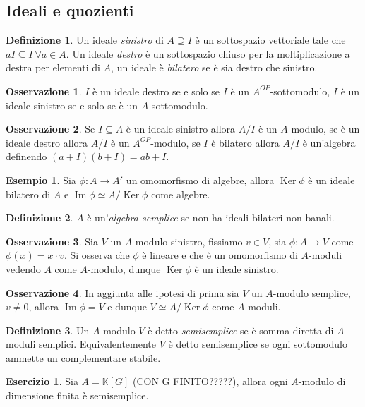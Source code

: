 \documentclass[11pt]{article}
\theoremstyle{plain}
\theoremstyle{definition}
\newtheorem{defn}{Definizione}[section]
\newtheorem{exmp}{Esempio}[section]
\newtheorem{exercise}{Esercizio}[section]
\newtheorem*{rem}{Osservazione}
\theoremstyle{remark}
\newcommand{\K}{\mathbb{K}}
\DeclareMathOperator{\Ker}{Ker}
\DeclareMathOperator{\Imm}{Im}
\DeclareMathOperator{\iso}{\simeq}
\begin{document}
\subsection{Ideali e quozienti}
	\begin{defn}
		Un ideale \textit{sinistro} di $A\supseteq I$ è un sottospazio vettoriale tale che $aI\subseteq I\ \forall a\in A$. Un ideale \textit{destro} è un sottospazio chiuso per la moltiplicazione a destra per elementi di $A$, un ideale è \textit{bilatero} se è sia destro che sinistro.
	\end{defn}
	\begin{rem}
		$I$ è un ideale destro se e solo se $I$ è un $A^{OP}$-sottomodulo, $I$ è un ideale sinistro se e solo se è un $A$-sottomodulo.
	\end{rem}
	\begin{rem}
		Se $I\subseteq A$ è un ideale sinistro allora $A/I$ è un $A$-modulo, se è un ideale destro allora $A/I$ è un $A^{OP}$-modulo, se $I$ è bilatero allora $A/I$ è un'algebra definendo $(a+I)(b+I)=ab+I$.
	\end{rem}
	\begin{exmp}
		Sia $\phi:A\to A'$ un omomorfismo di algebre, allora $\Ker \phi$ è un ideale bilatero di $A$ e $\Imm \phi \iso A/\Ker \phi$ come algebre.
	\end{exmp}
	\begin{defn}
		$A$ è un'\textit{algebra semplice} se non ha ideali bilateri non banali.
	\end{defn}
	\begin{rem}
		Sia $V$ un $A$-modulo sinistro, fissiamo $v\in V$, sia $\phi:A\to V$ come $\phi(x)=x\cdot v$. Si osserva che $\phi$ è lineare e che è un omomorfismo di $A$-moduli vedendo $A$ come $A$-modulo, dunque $\Ker \phi$ è un ideale sinistro.
	\end{rem}
	\begin{rem}
		In aggiunta alle ipotesi di prima sia $V$ un $A$-modulo semplice, $v\neq 0$, allora $\Imm \phi = V$ e dunque $V\iso A/\Ker \phi$ come $A$-moduli.
	\end{rem}
	\begin{defn}
		Un $A$-modulo $V$ è detto \textit{semisemplice} se è somma diretta di $A$-moduli semplici. Equivalentemente $V$ è detto semisemplice se ogni sottomodulo ammette un complementare stabile.
	\end{defn}
	\begin{exercise}
		Sia $A=\K[G]$ (CON G FINITO?????), allora ogni $A$-modulo di dimensione finita è semisemplice.
	\end{exercise}
\end{document}
